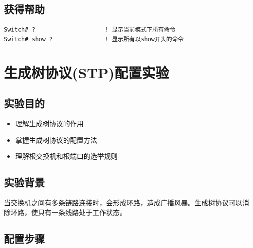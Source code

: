 \documentclass[12pt,a4paper]{ctexart}
\begin{document}
\subsection{获得帮助}

\begin{cmdbox}
\begin{lstlisting}
Switch# ?                    ! 显示当前模式下所有命令
Switch# show ?               ! 显示所有以show开头的命令
\end{lstlisting}
\end{cmdbox}


\section{生成树协议(STP)配置实验}

\subsection{实验目的}

\begin{itemize}[leftmargin=2em,itemsep=0pt]
    \item 理解生成树协议的作用
    \item 掌握生成树协议的配置方法
    \item 理解根交换机和根端口的选举规则
\end{itemize}

\subsection{实验背景}

当交换机之间有多条链路连接时，会形成环路，造成广播风暴。生成树协议可以消除环路，使只有一条线路处于工作状态。

\subsection{配置步骤}
\end{document}
